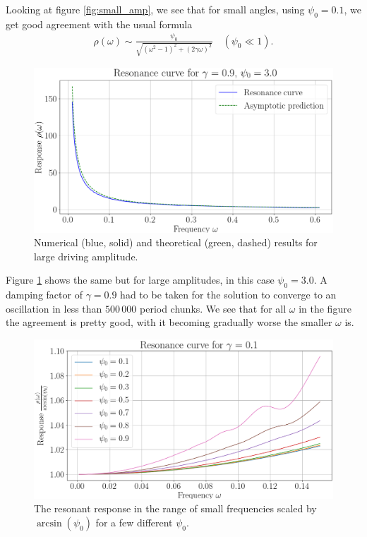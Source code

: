 \documentclass[10pt,a4paper,twocolumn]{article}
\begin{document}
Looking at figure \ref{fig:small_amp}, we see that for small angles, using $\psi_0 = 0.1$, we get good agreement with the usual formula
%
\begin{align}
\rho(\omega) \sim \frac{\psi_0}{\sqrt{(\omega^2-1)^2 + (2\gamma\omega)^2}} \quad (\psi_0 \ll 1).
\end{align}

\begin{figure}[h]
\centering
\captionsetup{justification=centering}
\includegraphics[scale=0.25]{large_amp.png}
\caption{Numerical (blue, solid) and theoretical (green, dashed) results for large driving amplitude.}
\label{fig:large_amp}
\end{figure}

Figure \ref{fig:large_amp} shows the same but for large amplitudes, in this case $\psi_0 = 3.0$. A damping factor of $\gamma = 0.9$ had to be taken for the solution to converge to an oscillation in less than $500\,000$ period chunks. We see that for all $\omega$ in the figure the agreement is pretty good, with it becoming gradually worse the smaller $\omega$ is.

\begin{figure}
\centering
\captionsetup{justification=centering}
\includegraphics[scale=0.25]{small_freq.png}
\caption{The resonant response in the range of small frequencies scaled by $\arcsin(\psi_0)$ for a few different $\psi_0$.}
\label{fig:small_freq}
\end{figure}
\end{document}

